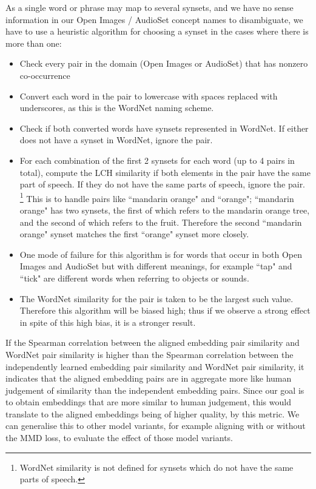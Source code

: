 As a single word or phrase may map to several synsets, and we have no sense information in our Open Images / AudioSet concept names to disambiguate, we have to use a heuristic algorithm for choosing a synset in the cases where there is more than one:

\begin{itemize}
    \item Check every pair in the domain (Open Images or AudioSet) that has nonzero co-occurrence
    \item Convert each word in the pair to lowercase with spaces replaced with underscores, as this is the WordNet naming scheme.
    \item Check if both converted words have synsets represented in WordNet. If either does not have a synset in WordNet, ignore the pair.
    \item For each combination of the first 2 synsets for each word (up to 4 pairs in total), compute the LCH similarity  if both elements in the pair have the same part of speech. If they do not have the same parts of speech, ignore the pair. \footnote{WordNet similarity is not defined for synsets which do not have the same parts of speech. } This is to handle pairs like ``mandarin orange" and ``orange"; ``mandarin orange" has two synsets, the first of which refers to the mandarin orange tree, and the second of which refers to the fruit. Therefore the second ``mandarin orange" synset matches the first ``orange" synset more closely. 
    \item One mode of failure for this algorithm is for words that occur in both Open Images and AudioSet but with different meanings, for example ``tap" and ``tick" are different words when referring to objects or sounds. 
    \item The WordNet similarity for the pair is taken to be the largest such value. Therefore this algorithm will be biased high; thus if we observe a strong effect in spite of this high bias, it is a stronger result. 
\end{itemize}

If the Spearman correlation between the aligned embedding pair similarity and WordNet pair similarity is higher than the Spearman correlation between the independently learned embedding pair similarity and WordNet pair similarity, it indicates that the aligned embedding pairs are in aggregate more like human judgement of similarity than the independent embedding pairs. Since our goal is to obtain embeddings that are more similar to human judgement, this would translate to the aligned embeddings being of higher quality, by this metric. We can generalise this to other model variants, for example aligning with or without the MMD loss, to evaluate the effect of those model variants. 

